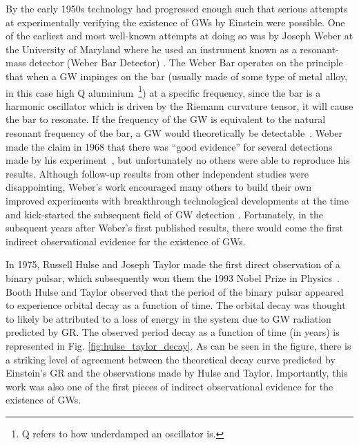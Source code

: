 By the early 1950s technology had progressed enough such that serious 
attempts at experimentally verifying the existence of \ac{GW}s by Einstein were possible. 
One of the earliest and most well-known attempts at doing so was by 
Joseph Weber at the University of Maryland where he used an instrument 
known as a resonant-mass detector (Weber Bar Detector) \cite{PhysRevLett.18.498}
. The Weber Bar 
operates on the principle that when a \ac{GW} impinges on the bar (usually 
made of some type of metal alloy, in this case high Q aluminium~\footnote{Q refers to how underdamped an oscillator is.}) at a 
specific frequency, since the bar is a harmonic oscillator which is driven by the Riemann curvature tensor, it will cause the bar to resonate. If the 
frequency of the \ac{GW} is equivalent 
to the natural resonant frequency of the bar, a \ac{GW} would theoretically be detectable~\cite{PhysRevLett.20.1307}. Weber made the claim in 1968 
that there was 
``good evidence'' for several detections made by his 
experiment~\cite{PhysRevLett.20.1307}, but unfortunately 
no others were able to reproduce his results. Although follow-up results from 
other independent studies were disappointing, 
Weber's work encouraged many others to build their own improved experiments with
breakthrough technological developments at the time and 
kick-started the subsequent field of \ac{GW} detection \cite{1009.1138}. 
Fortunately, in the subsquent years after Weber's 
first published results, there 
would come the first indirect observational evidence for the existence 
of \ac{GW}s.

%
%
In 1975, Russell Hulse and Joseph Taylor made the first direct observation  of a binary pulsar, which subsequently won them the 1993 Nobel Prize in Physics~\cite{1975ApJ...195L..51H}. Booth Hulse and Taylor observed that 
the period of the binary pulsar 
appeared to experience orbital decay as a function of time. The orbital 
decay was thought to likely be attributed to a loss of energy in the 
system due to \ac{GW} radiation predicted by \ac{GR}. The observed period 
decay as a function of time (in years) is represented
in Fig. \ref{fig:hulse_taylor_decay}. As can be seen in the figure, 
there is a striking level of agreement 
between the theoretical decay curve predicted by Einstein's \ac{GR} and 
the observations made by Hulse and Taylor. Importantly, this work was also 
one of the first pieces of indirect observational evidence for the existence of \ac{GW}s. 

